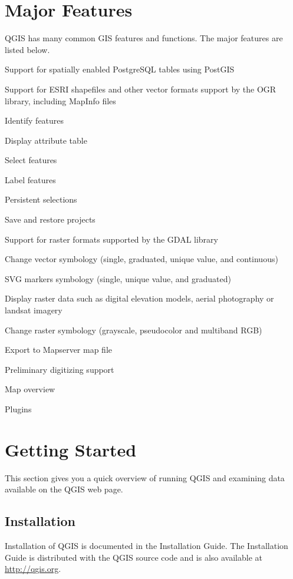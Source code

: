 \documentclass[10pt,english]{article}
\begin{document}
\begin{onehalfspace}
\begin{compactenum}
\end{compactenum}
\section{Major Features}

QGIS has many common GIS features and functions. The major features
are listed below. 

\begin{compactenum}
\item Support for spatially enabled PostgreSQL tables using PostGIS 
\item Support for ESRI shapefiles and other vector formats support by the
OGR library, including MapInfo files 
\item Identify features 
\item Display attribute table 
\item Select features 
\item Label features
\item Persistent selections 
\item Save and restore projects
\item Support for raster formats supported by the GDAL library 
\item Change vector symbology (single, graduated, unique value, and continuous) 
\item SVG markers symbology (single, unique value, and graduated) 
\item Display raster data such as digital elevation models, aerial photography
or landsat imagery 
\item Change raster symbology (grayscale, pseudocolor and multiband RGB) 
\item Export to Mapserver map file 
\item Preliminary digitizing support
\item Map overview
\item Plugins 
\end{compactenum}

\section{Getting Started}

This section gives you a quick overview of running QGIS and examining
data available on the QGIS web page.


\subsection{Installation}
Installation of QGIS is documented in the Installation Guide. The Installation Guide is distributed with the QGIS source code and is also available at \url{http://qgis.org}.



\end{onehalfspace}
\end{document}
